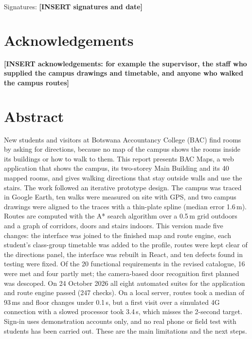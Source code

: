 \documentclass[12pt,a4paper]{report}
\newcommand{\placeholder}[1]{\textbf{[INSERT #1]}}
\begin{document}
\vspace{1cm}
Signatures: \placeholder{signatures and date}

\chapter*{Acknowledgements}
\placeholder{acknowledgements: for example the supervisor, the staff who supplied the campus drawings and timetable, and anyone who walked the campus routes}

\chapter*{Abstract}
New students and visitors at Botswana Accountancy College (BAC) find rooms by asking for directions, because no map of the campus shows the rooms inside its buildings or how to walk to them. This report presents BAC Maps, a web application that shows the campus, its two-storey Main Building and its 40 mapped rooms, and gives walking directions that stay outside walls and use the stairs. The work followed an iterative prototype design. The campus was traced in Google Earth, ten walks were measured on site with GPS, and two campus drawings were aligned to the traces with a thin-plate spline (median error 1.6\,m). Routes are computed with the A* search algorithm over a 0.5\,m grid outdoors and a graph of corridors, doors and stairs indoors. This version made five changes: the interface was joined to the finished map and route engine, each student's class-group timetable was added to the profile, routes were kept clear of the directions panel, the interface was rebuilt in React, and ten defects found in testing were fixed. Of the 20 functional requirements in the revised catalogue, 16 were met and four partly met; the camera-based door recognition first planned was descoped. On 24 October 2026 all eight automated suites for the application and route engine passed (247 checks). On a local server, routes took a median of 93\,ms and floor changes under 0.1\,s, but a first visit over a simulated 4G connection with a slowed processor took 3.4\,s, which misses the 2-second target. Sign-in uses demonstration accounts only, and no real phone or field test with students has been carried out. These are the main limitations and the next steps.

\tableofcontents
\listoffigures
\listoftables
\lstlistoflistings
\end{document}
